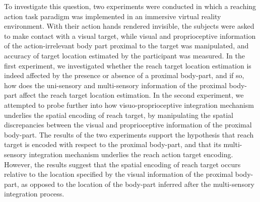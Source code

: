  To investigate this question, two experiments were conducted in which a reaching action task paradigm was implemented in an immersive virtual reality environment. With their action hands rendered invisible, the subjects were asked to make contact with a visual target, while visual and proprioceptive information of the action-irrelevant body part proximal to the target was manipulated, and accuracy of target location estimated by the participant was measured. In the first experiment, we investigated whether the reach target location estimation is indeed affected by the presence or absence of a proximal body-part, and if so, how does the uni-sensory and multi-sensory information of the proximal body-part affect the reach target location estimation. In the second experiment, we attempted to probe further into how visuo-proprioceptive integration mechanism underlies the spatial encoding of reach target, by manipulating the spatial discrepancies between the visual and proprioceptive information of the proximal body-part. The results of the two experiments support the hypothesis that reach target is encoded with respect to the proximal body-part, and that its multi-sensory integration mechanism underlies the reach action target encoding. However, the results suggest that the spatial encoding of reach target occurs relative to the location specified by the visual information of the proximal body-part, as opposed to the location of the body-part inferred after the multi-sensory integration process.


 

